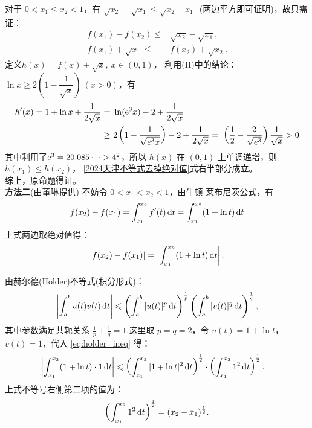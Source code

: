 \begin{enumerate}[label={【\textbf{例\thechapter.\arabic*}】},
 leftmargin=\inteval{\myenumleftmargin}pt,
 itemsep=\inteval{\myenumitempsep}pt,
 itemindent=\inteval{\myenumitemindent}pt]
对于 \(0 < x_1 \leq x_2 < 1\)，有 \(\sqrt{x_2} - \sqrt{x_1} \leq \sqrt{x_2 - x_1}\)\ (两边平方即可证明)，故只需证：
\begin{align*}
    f(x_1) - f(x_2)     \leq & \sqrt{x_2} - \sqrt{x_1}, \\
    f(x_1) + \sqrt{x_1} \leq & f(x_2) + \sqrt{x_2}. 
\end{align*}
定义$h(x) = f(x) + \sqrt{x}, \ x \in (0,1)$，
利用(II)中的结论：\(\ln x \geq 2 \left(1 - \dfrac{1}{\sqrt{x}}
\right) \ (x>0)\)，有
\begin{align*}
    h'(x) = 1 + \ln x + \frac{1}{2\sqrt{x}} 
    =&\ \ln(\mathrm{e}^3 x) - 2 + \frac{1}{2\sqrt{x}} \\
    \ge &\ 2\left(1-\frac{1}{\sqrt{e^3x}}\right)-2+
    \frac{1}{2\sqrt{x}} 
    =\ \left(\frac{1}{2}-\frac{2}{\sqrt{e^3}}\right)
    \frac{1}{\sqrt{x}}>0
\end{align*}
其中利用了$\mathrm{e}^3=20.085\cdots>4^2$，所以
\(h(x)\) 在 \((0,1)\) 上单调递增，则$h(x_1) \leq h(x_2)$，
\eqref{2024天津不等式去掉绝对值}式右半部分成立。\\
综上，原命题得证。\\
\textbf{方法二}(由董琳提供) 不妨令 $0 < x_1 < x_2 < 1$，由牛顿-莱布尼茨公式，有
\begin{gather*}
    f(x_2) - f(x_1) = \int_{x_1}^{x_2} f'(t) \, \mathrm{d} t=
    \int_{x_1}^{x_2} (1 + \ln t) \, \mathrm{d} t
\end{gather*}
上式两边取绝对值得：
\begin{gather*}
    |f(x_2) - f(x_1)| = \left| \int_{x_1}^{x_2} (1 + \ln t) \, \mathrm{d} t \right|.
\end{gather*}

由赫尔德(Hölder)不等式(积分形式)：
\begin{gather}
    \left| \int_a^b u(t) v(t) \, \mathrm{d} t \right| \leqslant \left( \int_a^b |u(t)|^p \, \mathrm{d} t \right)^{\frac{1}{p}} \left( \int_a^b |v(t)|^q \, \mathrm{d} t \right)^{\frac{1}{q}}, \label{eq:holder_ineq}
\end{gather}
其中参数满足共轭关系 $\frac{1}{p} + \frac{1}{q} = 1$.这里取 $p = q = 2$，令 $u(t) = 1 + \ln t$，$v(t) = 1$，代入 \eqref{eq:holder_ineq} 得：
\begin{align*}
    \left| \int_{x_1}^{x_2} (1 + \ln t) \cdot 1 \, \mathrm{d} t \right|
    &\leqslant \left( \int_{x_1}^{x_2} |1 + \ln t|^2 \, \mathrm{d} t \right)^{\frac{1}{2}} \cdot \left( \int_{x_1}^{x_2} 1^2 \, \mathrm{d} t \right)^{\frac{1}{2}}.
\end{align*}
上式不等号右侧第二项的值为：
\begin{gather*}
    \left( \int_{x_1}^{x_2} 1^2 \, \mathrm{d} t \right)^{\frac{1}{2}} = 
    (x_2 - x_1)^{\frac{1}{2}}.
\end{gather*}


\end{enumerate}
